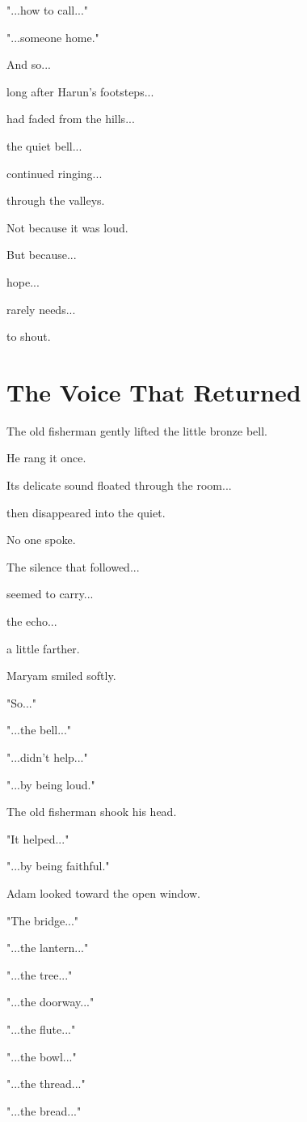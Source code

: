 \documentclass[12pt,openany]{book}
\begin{document}
"...how to call..."

"...someone home."

And so...

long after Harun's footsteps...

had faded from the hills...

the quiet bell...

continued ringing...

through the valleys.

Not because it was loud.

But because...

hope...

rarely needs...

to shout.
\section*{The Voice That Returned}

The old fisherman gently lifted the little bronze bell.

He rang it once.

Its delicate sound floated through the room...

then disappeared into the quiet.

No one spoke.

The silence that followed...

seemed to carry...

the echo...

a little farther.

Maryam smiled softly.

"So..."

"...the bell..."

"...didn't help..."

"...by being loud."

The old fisherman shook his head.

"It helped..."

"...by being faithful."

Adam looked toward the open window.

"The bridge..."

"...the lantern..."

"...the tree..."

"...the doorway..."

"...the flute..."

"...the bowl..."

"...the thread..."

"...the bread..."
\end{document}
